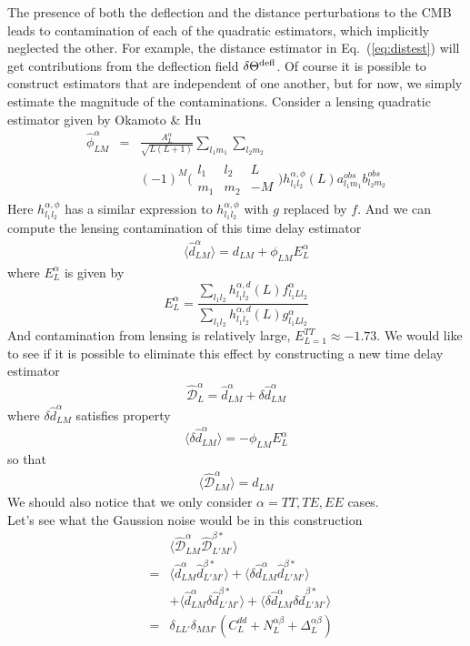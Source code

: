 \documentclass[prl,amsmath,amssymb,floatfix,superscriptaddress,nofootinbib,twocolumn]{revtex4-1}
\def\be{\begin{equation}}
\def\ee{\end{equation}}
\def\bea{\begin{eqnarray}}
\def\eea{\end{eqnarray}}
\newcommand{\ec}[1]{Eq.~(\ref{eq:#1})}
\begin{document}
The presence of both the deflection and the distance perturbations to the CMB leads to contamination of each of the quadratic estimators, which implicitly neglected the other. For example, the distance estimator in \ec{distest} will get contributions from the deflection field $\delta\Theta^{\rm defl}$. Of course it is possible to construct estimators that are independent of one another, but for now, we simply estimate the magnitude of the contaminations.
Consider a lensing quadratic estimator given by Okamoto \& Hu
\bea
\hat{\phi}^{\alpha}_{LM} &=&\nonumber \frac{A_{L}^{\alpha}}{\sqrt{L(L+1)}}\sum_{l_{1}m_{1}}\sum_{l_{2}m_{2}} \\
&& (-1)^{M}\bigl(\begin{smallmatrix} l_1 & l_2 & L \\ m_1 & m_2 & -M  \end{smallmatrix}\bigr) h^{\alpha,\phi}_{l_{1}l_{2}}(L) a^{obs}_{l_{1}m_{1}}b^{obs}_{l_{2}m_{2}}
\eea
Here $h^{\alpha,\phi}_{l_{1}l_{2}}$ has a similar expression to $h^{\alpha,\phi}_{l_{1}l_{2}}$ with $g$ replaced by $f$. And we can compute the lensing contamination of this time delay estimator
\bea
&& \langle \hat{d}^{\alpha}_{LM} \rangle = d_{LM} +\phi_{LM}E_{L}^{\alpha}
\eea
where $E^{\alpha}_{L}$ is given by
\be
E^{\alpha}_{L} = \frac{\sum_{l_{1}l_{2}}h_{l_{1}l_{2}}^{\alpha,d}(L)f_{l_{1}Ll_{2}}^{\alpha}}{\sum_{l_{1}l_{2}}h_{l_{1}l_{2}}^{\alpha,d}(L)g_{l_{1}Ll_{2}}^{\alpha}}
\ee
And contamination from lensing is relatively large, $E_{L=1}^{TT} \approx -1.73$. We would like to see if it is possible to eliminate this effect by constructing a new time delay estimator
\bea
\hat{\mathcal{D}}_{L}^{\alpha} = \hat{d}_{LM}^{\alpha}+\delta\hat{d}_{LM}^{\alpha}
\eea 
where $\delta\hat{d}_{LM}^{\alpha}$ satisfies property
\bea 
\langle \delta\hat{d}_{LM}^{\alpha} \rangle = - \phi_{LM}E_{L}^{\alpha}
\eea 
so that
\bea 
\langle \hat{\mathcal{D}}_{LM}^{\alpha} \rangle = d_{LM}
\eea 
We should also notice that we only consider $\alpha = TT, TE, EE$ cases. \\
Let's see what the Gaussion noise would be in this construction
\bea 
&&\langle \hat{\mathcal{D}}_{LM}^{\alpha}\hat{\mathcal{D}}_{L'M'}^{\beta*} \rangle \nonumber \\
&=&\langle \hat{d}_{LM}^{\alpha}\hat{d}_{L'M'}^{\beta*} \rangle + \langle \delta\hat{d}_{LM}^{\alpha}\hat{d}_{L'M'}^{\beta*} \rangle \nonumber \\
&&+\langle \hat{d}_{LM}^{\alpha}\delta\hat{d}_{L'M'}^{\beta*} \rangle + \langle \delta\hat{d}_{LM}^{\alpha}\delta\hat{d}_{L'M'}^{\beta*} \rangle \nonumber \\
&=&\delta_{LL'}\delta_{MM'}(C_{L}^{dd}+N_{L}^{\alpha\beta}+\Delta_{L}^{\alpha\beta})
\eea 


\end{document}
